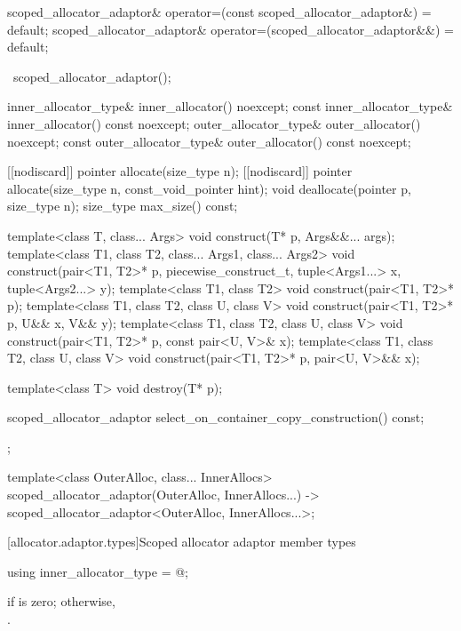 \begin{codeblock}
{{    scoped_allocator_adaptor& operator=(const scoped_allocator_adaptor&) = default;
    scoped_allocator_adaptor& operator=(scoped_allocator_adaptor&&) = default;

    ~scoped_allocator_adaptor();

    inner_allocator_type& inner_allocator() noexcept;
    const inner_allocator_type& inner_allocator() const noexcept;
    outer_allocator_type& outer_allocator() noexcept;
    const outer_allocator_type& outer_allocator() const noexcept;

    [[nodiscard]] pointer allocate(size_type n);
    [[nodiscard]] pointer allocate(size_type n, const_void_pointer hint);
    void deallocate(pointer p, size_type n);
    size_type max_size() const;

    template<class T, class... Args>
      void construct(T* p, Args&&... args);
    template<class T1, class T2, class... Args1, class... Args2>
      void construct(pair<T1, T2>* p, piecewise_construct_t,
                     tuple<Args1...> x, tuple<Args2...> y);
    template<class T1, class T2>
      void construct(pair<T1, T2>* p);
    template<class T1, class T2, class U, class V>
      void construct(pair<T1, T2>* p, U&& x, V&& y);
    template<class T1, class T2, class U, class V>
      void construct(pair<T1, T2>* p, const pair<U, V>& x);
    template<class T1, class T2, class U, class V>
      void construct(pair<T1, T2>* p, pair<U, V>&& x);

    template<class T>
      void destroy(T* p);

    scoped_allocator_adaptor select_on_container_copy_construction() const;
  };

  template<class OuterAlloc, class... InnerAllocs>
    scoped_allocator_adaptor(OuterAlloc, InnerAllocs...)
      -> scoped_allocator_adaptor<OuterAlloc, InnerAllocs...>;
}
\end{codeblock}

[allocator.adaptor.types]{Scoped allocator adaptor member types}

%
\begin{itemdecl}
using inner_allocator_type = @\seebelow@;
\end{itemdecl}

\begin{itemdescr}
\pnum
\ctype {} if  is
zero; otherwise,\\ .
\end{itemdescr}

